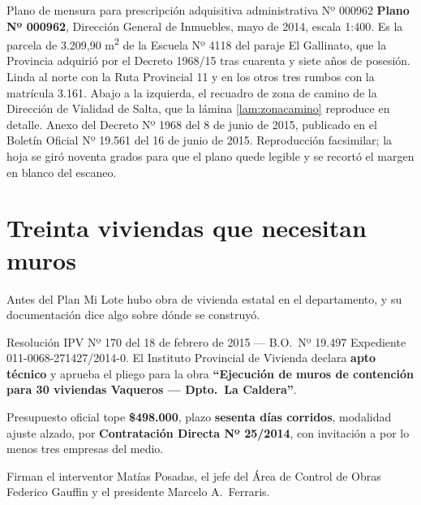 %
{Plano de mensura para prescripción adquisitiva administrativa Nº 000962}%
{\textbf{Plano Nº 000962}, Dirección General de Inmuebles, mayo de 2014, escala 1:400. Es la
parcela de 3.209,90 m\textsuperscript{2} de la Escuela Nº 4118 del paraje El Gallinato, que
la Provincia adquirió por el Decreto 1968/15 tras cuarenta y siete años de posesión. Linda al
norte con la Ruta Provincial 11 y en los otros tres rumbos con la matrícula 3.161. Abajo a la
izquierda, el recuadro de zona de camino de la Dirección de Vialidad de Salta, que la lámina
\ref{lam:zonacamino} reproduce en detalle.}%
{Anexo del Decreto Nº 1968 del 8 de junio de 2015, publicado en el Boletín Oficial Nº 19.561
del 16 de junio de 2015. Reproducción facsimilar; la hoja se giró noventa grados para que el
plano quede legible y se recortó el margen en blanco del escaneo.}

\section{Treinta viviendas que necesitan muros}

Antes del Plan Mi Lote hubo obra de vivienda estatal en el departamento, y su documentación dice algo sobre dónde se construyó.

\begin{ficha}{Resolución IPV Nº 170 del 18 de febrero de 2015 --- B.O.\ Nº 19.497}
Expediente 011-0068-271427/2014-0. El Instituto Provincial de Vivienda declara \textbf{apto técnico} y aprueba el pliego para la obra \textbf{``Ejecución de muros de contención para 30 viviendas Vaqueros --- Dpto.\ La Caldera''}.

Presupuesto oficial tope \textbf{\$498.000}, plazo \textbf{sesenta días corridos}, modalidad ajuste alzado, por \textbf{Contratación Directa Nº 25/2014}, con invitación a por lo menos tres empresas del medio.

Firman el interventor Matías Posadas, el jefe del Área de Control de Obras Federico Gauffin y el presidente Marcelo A.\ Ferraris.
\end{ficha}

